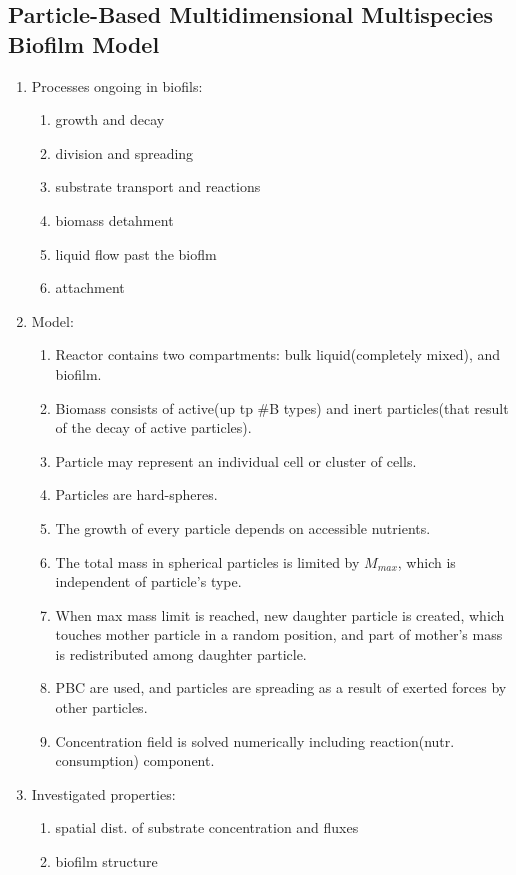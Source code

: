 \documentclass[10pt,a4paper]{article}
\begin{document}
\subsection{Particle-Based Multidimensional Multispecies Biofilm Model \cite{pic:04}}
\begin{enumerate}
 \item Processes ongoing in biofils:
 \begin{enumerate}
  \item growth and decay
  \item division and spreading
  \item substrate transport and reactions
  \item biomass detahment
  \item liquid flow past the bioflm
  \item attachment
 \end{enumerate}
 \item Model:
 \begin{enumerate}
  \item Reactor contains two compartments: bulk liquid(completely mixed), and biofilm.
  \item Biomass consists of active(up tp \#B types) and inert particles(that result of the decay of active particles).
  \item Particle may represent an individual cell or cluster of cells.
  \item Particles are hard-spheres.
  \item The growth of every particle depends on accessible nutrients.
  \item The total mass in spherical particles is limited by $M_{max}$, which is independent of particle's type.
  \item When max mass limit is reached, new daughter particle is created, which touches mother particle in a random position, 
  and part of mother's mass is redistributed among daughter particle.
  \item PBC are used, and particles are spreading as a result of exerted forces by other particles.
  \item Concentration field is solved numerically including reaction(nutr. consumption) component.
 \end{enumerate}
 \item Investigated properties:
 \begin{enumerate}
  \item spatial dist. of substrate concentration and fluxes
  \item biofilm structure

\end{enumerate}
\end{enumerate}
\end{document}
